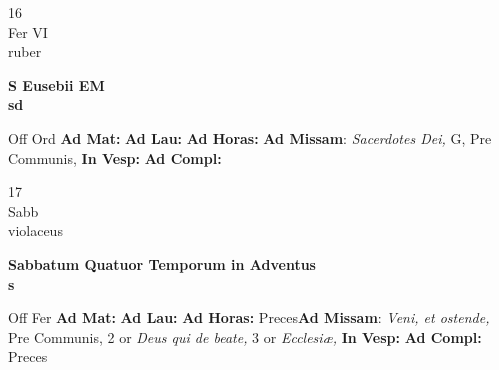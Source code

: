 \documentclass[10pt, openany]{book}
\begin{document}
        \begin{center}
            \begin{minipage}{3.5in}
                \vspace{2em}
                \begin{minipage}{0.5in}
                    {\Huge 16} \\
                    {\normalsize Fer VI} \\
                    {\normalsize ruber}
                \end{minipage}
                \begin{minipage}{3.0in}
                    \textbf{ \large S Eusebii EM \\
                    \textnormal{\normalsize sd}} \\ 
                \end{minipage}
                \begin{justify}Off Ord
                    \textbf{Ad Mat: }
                    \textbf{Ad Lau: }
                    \textbf{Ad Horas: }\textbf{Ad Missam}: \textit{Sacerdotes Dei,} G, Pre Communis,  
                    \textbf{In Vesp: }
                    \textbf{Ad Compl: }
                \end{justify}
            \end{minipage}
        \end{center}
    
        \begin{center}
            \begin{minipage}{3.5in}
                \vspace{2em}
                \begin{minipage}{0.5in}
                    {\Huge 17} \\
                    {\normalsize Sabb} \\
                    {\normalsize violaceus}
                \end{minipage}
                \begin{minipage}{3.0in}
                    \textbf{ \large Sabbatum Quatuor Temporum in Adventus \\
                    \textnormal{\normalsize s}} \\ 
                \end{minipage}
                \begin{justify}Off Fer
                    \textbf{Ad Mat: }
                    \textbf{Ad Lau: }
                    \textbf{Ad Horas: }Preces\textbf{Ad Missam}: \textit{Veni, et ostende,} Pre Communis, 2 or \textit{Deus qui de beate,} 3 or \textit{Ecclesiæ,}  
                    \textbf{In Vesp: }
                    \textbf{Ad Compl: }Preces
                \end{justify}
            \end{minipage}
        \end{center}
    
\end{document}
